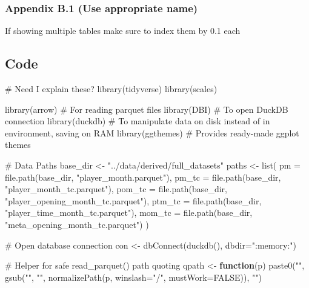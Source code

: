 \documentclass[
  12pt]{article}
\newenvironment{Shaded}{\begin{snugshade}}{\end{snugshade}}
\newcommand{\AttributeTok}[1]{\textcolor[rgb]{0.40,0.45,0.13}{#1}}
\newcommand{\CommentTok}[1]{\textcolor[rgb]{0.37,0.37,0.37}{#1}}
\newcommand{\ConstantTok}[1]{\textcolor[rgb]{0.56,0.35,0.01}{#1}}
\newcommand{\ControlFlowTok}[1]{\textcolor[rgb]{0.00,0.23,0.31}{\textbf{#1}}}
\newcommand{\FunctionTok}[1]{\textcolor[rgb]{0.28,0.35,0.67}{#1}}
\newcommand{\NormalTok}[1]{\textcolor[rgb]{0.00,0.23,0.31}{#1}}
\newcommand{\OtherTok}[1]{\textcolor[rgb]{0.00,0.23,0.31}{#1}}
\newcommand{\StringTok}[1]{\textcolor[rgb]{0.13,0.47,0.30}{#1}}
\begin{document}
\subsubsection{Appendix B.1 (Use appropriate
name)}\label{appendix-b.1-use-appropriate-name}

If showing multiple tables make sure to index them by 0.1 each

\subsection{Code}\label{code}

\begin{Shaded}
\begin{Highlighting}[]
\CommentTok{\# Need I explain these?}
\FunctionTok{library}\NormalTok{(tidyverse) }
\FunctionTok{library}\NormalTok{(scales)}

\FunctionTok{library}\NormalTok{(arrow) }\CommentTok{\# For reading parquet files}
\FunctionTok{library}\NormalTok{(DBI) }\CommentTok{\# To open DuckDB connection}
\FunctionTok{library}\NormalTok{(duckdb) }\CommentTok{\# To manipulate data on disk instead of in environment, saving on RAM}
\FunctionTok{library}\NormalTok{(ggthemes) }\CommentTok{\# Provides ready{-}made ggplot themes}

\CommentTok{\# Data Paths}
\NormalTok{base\_dir }\OtherTok{\textless{}{-}} \StringTok{"../data/derived/full\_datasets"}
\NormalTok{paths }\OtherTok{\textless{}{-}} \FunctionTok{list}\NormalTok{(}
  \AttributeTok{pm =} \FunctionTok{file.path}\NormalTok{(base\_dir, }\StringTok{"player\_month.parquet"}\NormalTok{),}
  \AttributeTok{pm\_tc =} \FunctionTok{file.path}\NormalTok{(base\_dir, }\StringTok{"player\_month\_tc.parquet"}\NormalTok{),}
  \AttributeTok{pom\_tc =} \FunctionTok{file.path}\NormalTok{(base\_dir, }\StringTok{"player\_opening\_month\_tc.parquet"}\NormalTok{),}
  \AttributeTok{ptm\_tc =} \FunctionTok{file.path}\NormalTok{(base\_dir, }\StringTok{"player\_time\_month\_tc.parquet"}\NormalTok{),}
  \AttributeTok{mom\_tc =} \FunctionTok{file.path}\NormalTok{(base\_dir, }\StringTok{"meta\_opening\_month\_tc.parquet"}\NormalTok{)}
\NormalTok{)}

\CommentTok{\# Open database connection}
\NormalTok{con }\OtherTok{\textless{}{-}} \FunctionTok{dbConnect}\NormalTok{(}\FunctionTok{duckdb}\NormalTok{(), }\AttributeTok{dbdir=}\StringTok{":memory:"}\NormalTok{)}

\CommentTok{\# Helper for safe \textasciigrave{}read\_parquet()\textasciigrave{} path quoting}
\NormalTok{qpath }\OtherTok{\textless{}{-}} \ControlFlowTok{function}\NormalTok{(p) }\FunctionTok{paste0}\NormalTok{(}\StringTok{"\textquotesingle{}"}\NormalTok{, }\FunctionTok{gsub}\NormalTok{(}\StringTok{"\textquotesingle{}"}\NormalTok{, }\StringTok{"\textquotesingle{}\textquotesingle{}"}\NormalTok{, }\FunctionTok{normalizePath}\NormalTok{(p, }\AttributeTok{winslash=}\StringTok{"/"}\NormalTok{, }\AttributeTok{mustWork=}\ConstantTok{FALSE}\NormalTok{)), }\StringTok{"\textquotesingle{}"}\NormalTok{)}


\end{Highlighting}
\end{Shaded}
\end{document}

